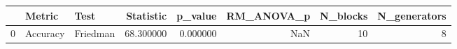 \begin{tabular}{lllrrrrr}
\toprule
 & Metric & Test & Statistic & p_value & RM_ANOVA_p & N_blocks & N_generators \\
\midrule
0 & Accuracy & Friedman & 68.300000 & 0.000000 & NaN & 10 & 8 \\
\bottomrule
\end{tabular}
